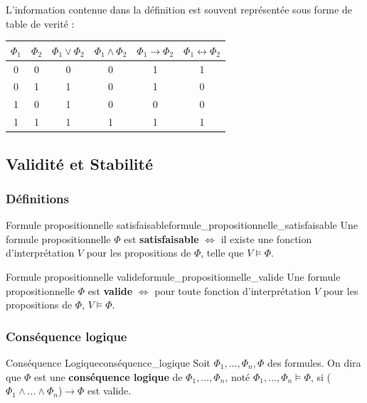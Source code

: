 L'information contenue dans la définition est souvent représentée sous forme de table de verité : 
\begin{center}
  \begin{tabular}{|c|c|c|c|c|c|}
    \hline 
    $\Phi_1$ & $\Phi_2$ & $\Phi_1\vee\Phi_2$ & $\Phi_1\wedge\Phi_2$ & $\Phi_1\rightarrow\Phi_2$ & $\Phi_1\leftrightarrow\Phi_2$ \\ 
    \hline 
    0 & 0 & 0 & 0 & 1 & 1 \\ 
    \hline 
    0 & 1 & 1 & 0 & 1 & 0 \\ 
    \hline 
    1 & 0 & 1 & 0 & 0 & 0 \\ 
    \hline 
    1 & 1 & 1 & 1 & 1 & 1 \\ 
    \hline 
  \end{tabular}
\end{center}



\subsection{Validité et Stabilité}
\subsubsection{Définitions}
\begin{definition}{Formule propositionnelle satisfaisable}{formule_propositionnelle_satisfaisable}
Une formule propositionnelle $\Phi$ est \textbf{satisfaisable} $\Leftrightarrow$ il existe une fonction d'interprétation $V$ pour les propositions de $\Phi$, telle que 
$V\vDash\Phi$.
\end{definition}
\begin{definition}{Formule propositionnelle valide}{formule_propositionnelle_valide}
Une formule propositionnelle $\Phi$ est \textbf{valide} $\Leftrightarrow$ pour toute fonction d'interprétation $V$ pour les propositions de $\Phi$, $V\vDash\Phi$.
\end{definition}

\subsubsection{Conséquence logique}
\begin{definition}{Conséquence Logique}{conséquence_logique}
Soit $\Phi_1,...,\Phi_n,\Phi$ des formules. On dira que $\Phi$ est une \textbf{conséquence logique} de $\Phi_1,...,\Phi_n$, noté $\Phi_1,...,\Phi_n\vDash\Phi$, si ($\Phi_1\land ...\land\Phi_n$)$\rightarrow\Phi$ est valide.
\end{definition}

